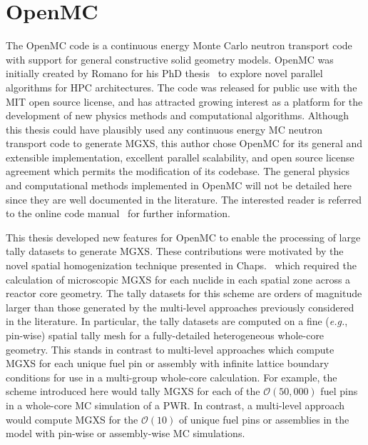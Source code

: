 

\section{OpenMC}
\label{sec:chap4-openmc}

The OpenMC code is a continuous energy Monte Carlo neutron transport code~\cite{romano2013openmc} with support for general constructive solid geometry models. OpenMC was initially created by Romano for his PhD thesis~\cite{romano2013parallel} to explore novel parallel algorithms for \ac{HPC} architectures. The code was released for public use with the MIT open source license, and has attracted growing interest as a platform for the development of new physics methods and computational algorithms. Although this thesis could have plausibly used any continuous energy \ac{MC} neutron transport code to generate \ac{MGXS}, this author chose OpenMC for its general and extensible implementation, excellent parallel scalability, and open source license agreement which permits the modification of its codebase. The general physics and computational methods implemented in OpenMC will not be detailed here since they are well documented in the literature. The interested reader is referred to the online code manual~\cite{openmc2016manual} for further information.

This thesis developed new features for OpenMC to enable the processing of large tally datasets to generate \ac{MGXS}. These contributions were motivated by the novel spatial homogenization technique presented in 
Chaps.~ which required the calculation of microscopic \ac{MGXS} for each nuclide in each spatial zone across a reactor core geometry. The tally datasets for this scheme are orders of magnitude larger than those generated by the multi-level approaches previously considered in the literature. In particular, the tally datasets are computed on a fine (\textit{e.g.}, pin-wise) spatial tally mesh for a fully-detailed heterogeneous whole-core geometry. This stands in contrast to multi-level approaches which compute \ac{MGXS} for each unique fuel pin or assembly with infinite lattice boundary conditions for use in a multi-group whole-core calculation. For example, the scheme introduced here would tally \ac{MGXS} for each of the $\mathcal{O}(50,000)$ fuel pins in a whole-core \ac{MC} simulation of a \ac{PWR}. In contrast, a multi-level approach would compute \ac{MGXS} for the $\mathcal{O}(10)$ of unique fuel pins or assemblies in the model with pin-wise or assembly-wise \ac{MC} simulations.

